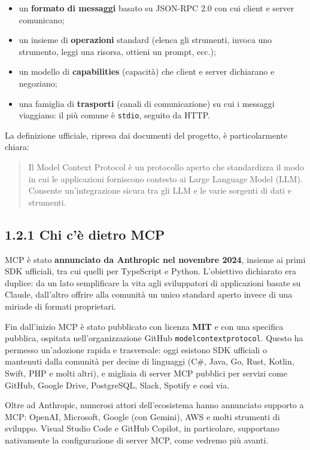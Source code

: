 \documentclass[
  italian,
  10pt,
]{book}
\providecommand{\tightlist}{%
  \setlength{\itemsep}{0pt}\setlength{\parskip}{0pt}}
\begin{document}
\begin{itemize}
\tightlist
\item
  un \textbf{formato di messaggi} basato su JSON-RPC 2.0 con cui client
  e server comunicano;
\item
  un insieme di \textbf{operazioni} standard (elenca gli strumenti,
  invoca uno strumento, leggi una risorsa, ottieni un prompt, ecc.);
\item
  un modello di \textbf{capabilities} (capacità) che client e server
  dichiarano e negoziano;
\item
  una famiglia di \textbf{trasporti} (canali di comunicazione) su cui i
  messaggi viaggiano: il più comune è \texttt{stdio}, seguito da HTTP.
\end{itemize}

La definizione ufficiale, ripresa dai documenti del progetto, è
particolarmente chiara:

\begin{quote}
Il Model Context Protocol è un protocollo aperto che standardizza il
modo in cui le applicazioni forniscono contesto ai Large Language Model
(LLM). Consente un'integrazione sicura tra gli LLM e le varie sorgenti
di dati e strumenti.
\end{quote}

\subsection{1.2.1 Chi c'è dietro MCP}\label{chi-cuxe8-dietro-mcp}

MCP è stato \textbf{annunciato da Anthropic nel novembre 2024}, insieme
ai primi SDK ufficiali, tra cui quelli per TypeScript e Python.
L'obiettivo dichiarato era duplice: da un lato semplificare la vita agli
sviluppatori di applicazioni basate su Claude, dall'altro offrire alla
comunità un unico standard aperto invece di una miriade di formati
proprietari.

Fin dall'inizio MCP è stato pubblicato con licenza \textbf{MIT} e con
una specifica pubblica, ospitata nell'organizzazione GitHub
\texttt{modelcontextprotocol}. Questo ha permesso un'adozione rapida e
trasversale: oggi esistono SDK ufficiali o mantenuti dalla comunità per
decine di linguaggi (C\#, Java, Go, Rust, Kotlin, Swift, PHP e molti
altri), e migliaia di server MCP pubblici per servizi come GitHub,
Google Drive, PostgreSQL, Slack, Spotify e così via.

Oltre ad Anthropic, numerosi attori dell'ecosistema hanno annunciato
supporto a MCP: OpenAI, Microsoft, Google (con Gemini), AWS e molti
strumenti di sviluppo. Visual Studio Code e GitHub Copilot, in
particolare, supportano nativamente la configurazione di server MCP,
come vedremo più avanti.
\end{document}
